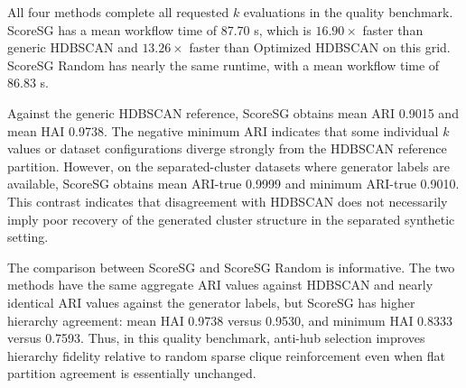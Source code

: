 \documentclass[11pt]{article}
\begin{document}
\begin{table}[H]
\centering
\caption{Quality results for the Gaussian synthetic benchmark. Values aggregate 40 dataset configurations and 1960 requested \(k\) evaluations per method. ARI-ref is computed against HDBSCAN with the generic internal algorithm. ARI-true is computed only for separated-cluster datasets, where generator labels are available. Workflow time is the mean cumulative time, in seconds, over the 49-value multi-\(k\) sequence.}
\label{tab:quality-layout}
\end{table}

All four methods complete all requested \(k\) evaluations in the quality benchmark. ScoreSG has a mean workflow time of 87.70 s, which is \(16.90\times\) faster than generic HDBSCAN and \(13.26\times\) faster than Optimized HDBSCAN on this grid. ScoreSG Random has nearly the same runtime, with a mean workflow time of 86.83 s.

Against the generic HDBSCAN reference, ScoreSG obtains mean ARI 0.9015 and mean HAI 0.9738. The negative minimum ARI indicates that some individual \(k\) values or dataset configurations diverge strongly from the HDBSCAN reference partition. However, on the separated-cluster datasets where generator labels are available, ScoreSG obtains mean ARI-true 0.9999 and minimum ARI-true 0.9010. This contrast indicates that disagreement with HDBSCAN does not necessarily imply poor recovery of the generated cluster structure in the separated synthetic setting.

The comparison between ScoreSG and ScoreSG Random is informative. The two methods have the same aggregate ARI values against HDBSCAN and nearly identical ARI values against the generator labels, but ScoreSG has higher hierarchy agreement: mean HAI 0.9738 versus 0.9530, and minimum HAI 0.8333 versus 0.7593. Thus, in this quality benchmark, anti-hub selection improves hierarchy fidelity relative to random sparse clique reinforcement even when flat partition agreement is essentially unchanged.
\end{document}
